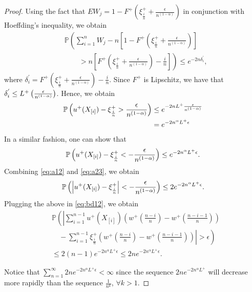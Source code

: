 \begin{proof}
Using the fact that 
$E W_j = 1-F^{+}\left(\xi^+_{\frac{i}{n}} +\frac{\epsilon}{n^{(1-\alpha)}}\right)$ in conjunction with Hoeffding's inequality, we obtain
\begin{align*}
&\mathbb{P} \left( \sum _{i=1}^{n} W_j - n  \left[1-F^{+}\left(\xi^+_{\frac{i}{n}} +\frac{\epsilon}{n^{(1-\alpha) }  } \right) \right] \right.\\
&\left.\qquad> n
 \left[F^{+}\left(\xi^+_{\frac{i}{n}} +\frac{\epsilon}{n^{(1-\alpha)} } \right) - \frac{i}{n}\right]\right) \le e^{-2n
\delta^{'}_i},
\end{align*}
where $\delta^{'}_i= F^{+}\left(\xi^+_{\frac{i}{n}} +\frac{\epsilon} {n^{(1-\alpha)} }\right) - \frac{i}{n}$. Since 
$F^{+}$ is Lipschitz, we have that $ \delta^{'}_i \leq L^{+} \left(\frac{\epsilon}{n^{(1-\alpha)}}\right)$.
Hence, we obtain
\begin{align}
\mathbb{P}\left(  u^+(X_{[i]}) - \xi^+_{\frac{i}{n}} > \frac {\epsilon}{n^{(1-\alpha)}} \right) &\le e^{-2n L^{+}
\frac{\epsilon}{n^{(1-\alpha)}} } \nonumber\\
&= e^{-2n^\alpha  L ^{+} \epsilon}
\label{eq:a12}
\end{align}
In a  similar fashion, one can show that 
\begin{align}
\mathbb{P}\left(  u^+(X_{[i]}) -\xi^+_{\frac{i}{n}} < -\frac {\epsilon} {n^{(1-\alpha)}} \right) \leq e^{-2n^\alpha  L^{+}  \epsilon}.
\label{eq:a23}
\end{align}
Combining \eqref{eq:a12} and \eqref{eq:a23},  we obtain 
\begin{align*}
\mathbb{P}\left(  \left| u^+(X_{[i]}) -\xi^+_{\frac{i}{n}} \right| < -\frac {\epsilon} {n^{(1-\alpha)}} \right) \leq 2
e^{-2n^\alpha  L^{+} \epsilon}. 
\end{align*}
Plugging the above in \eqref{eq:bd12}, we obtain
\begin{align}
&
\mathbb{P} \left( \left| \sum_{i=1}^{n-1} u^+\left(X_{[i]}\right)  \left(w^+\left(\frac{n-i}{n} \right)  - w^+\left(\frac{n-i-1}{n} \right) \right) \right.\right. \nonumber\\
&\left.\left.\quad -
\sum_{i=1}^{n-1} \xi^+_{\frac{i}{n}} \left(w^+\left(\frac{n-i}{n} \right)  - w^+\left(\frac{n-i-1}{n} \right) \right) \right| >
\epsilon\right) \nonumber\\
&\leq 2(n-1) e^{-2n^\alpha  L^{+}\epsilon} \leq 2ne^{-2n^\alpha  L^{+}\epsilon}.\label{eq:holder-sample-complexity-extract}
\end{align}

Notice that $\sum_{n=1}^{\infty}  2n  e^{-2n^{\alpha} L^{+} \epsilon}< \infty$ since the sequence 
$2n e^{-2n^{\alpha} L^{+}}$ will decrease more rapidly than the sequence
$\frac{1}{n^k}$, $\forall k>1$.


\end{proof}
